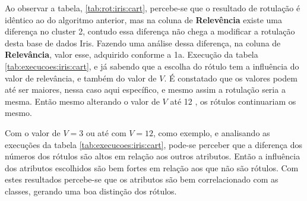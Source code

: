 Ao observar a tabela, \ref{tab:rot:iris:cart}, percebe-se que o resultado de rotulação é idêntico ao do algoritmo anterior, mas na coluna de \textbf{Relevência} existe uma diferença no cluster 2, contudo essa diferença não chega  a modificar a rotulação desta base de dados Iris.
Fazendo uma análise dessa diferença, na coluna de \textbf{Relevância}, valor esse, adquirido conforme a 1a. Execução da tabela \ref{tab:execucoes:iris:cart}, e já sabendo que a escolha do rótulo tem a influência do valor de relevância, e também do valor de ${V}$. É constatado que os valores podem até ser maiores, nessa caso aqui específico, e mesmo assim a rotulação seria a mesma. Então mesmo alterando o valor de ${V}$ até 12 , os rótulos continuariam os mesmo.

Com o valor de ${V=3}$ ou até com ${V=12}$, como exemplo, e analisando as execuções da tabela \ref{tab:execucoes:iris:cart}, pode-se perceber que a diferença dos números dos rótulos são altos em relação aos outros atributos. Então a influência dos atributos escolhidos são bem fortes em relação aos que não são rótulos. Com estes resultados percebe-se que os atributos são bem correlacionado com as classes, gerando uma boa distinção dos rótulos.  


